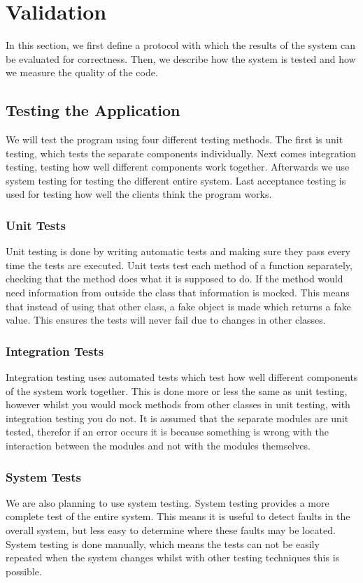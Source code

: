 \section{Validation}
In this section, we first define a protocol with which the results of the system can be evaluated for correctness. Then, we describe how the system is tested and how we measure the quality of the code.

\subsection{Testing the Application}
We will test the program using four different testing methods. The first is unit testing, which tests the separate components individually. Next comes integration testing, testing how well different components work together. Afterwards we use system testing for testing the different entire system. Last acceptance testing is used for testing how well the clients think the program works.

\subsubsection{Unit Tests}
Unit testing is done by writing automatic tests and making sure they pass every time the tests are executed. Unit tests test each method of a function separately, checking that the method does what it is supposed to do. If the method would need information from outside the class that information is mocked. This means that instead of using that other class, a fake object is made which returns a fake value. This ensures the tests will never fail due to changes in other classes.

\subsubsection{Integration Tests}
Integration testing uses automated tests which test how well different components of the system work together. This is done more or less the same as unit testing, however whilst you would mock methods from other classes in unit testing, with integration testing you do not. It is assumed that the separate modules are unit tested, therefor if an error occurs it is because something is wrong with the interaction between the modules and not with the modules themselves. 

\subsubsection{System Tests}
We are also planning to use system testing. System testing provides a more complete test of the entire system. This means it is useful to detect faults in the overall system, but less easy to determine where these faults may be located. System testing is done manually, which means the tests can not be easily repeated when the system changes whilst with other testing techniques this is possible.

